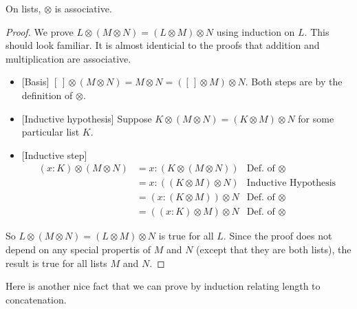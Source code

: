\ipadbreak

\begin{lemma}
On lists, $\otimes$ is associative.

\begin{proof}
We prove $L\otimes(M\otimes N) =
  (L\otimes M)\otimes N$ using induction on $L$. This should look
  familiar. It is almost identicial to the proofs that addition and
  multiplication are associative.

  \begin{itemize}
  \item{}[Basis] $[\,]\otimes(M\otimes N) = M\otimes N = ([\,]\otimes M)\otimes
    N$. Both steps are by the definition of $\otimes$.
  \item{} [Inductive hypothesis] Suppose $K\otimes(M\otimes N) = (K\otimes
    M)\otimes N$ for some particular list $K$.
  \item{} [Inductive step]
    \begin{align*}
      (x:K)\otimes (M\otimes N) &= x:(K\otimes (M\otimes N)) &\mbox{Def. of $\otimes$}\\
      &= x:((K\otimes M)\otimes N) &\mbox{Inductive Hypothesis}\\
      &= (x:(K\otimes M))\otimes N &\mbox{Def. of $\otimes$}\\
      &= ((x:K)\otimes M)\otimes N &\mbox{Def. of $\otimes$}
    \end{align*}
  \end{itemize}
  So $L\otimes(M\otimes N) = (L\otimes M)\otimes N$ is true for all $L$. Since the proof
  does not depend on any special propertis of $M$ and $N$ (except that they are both lists),
  the result is true for all lists $M$ and $N$.
\end{proof}
\end{lemma}

\ipadbreak

Here is another nice fact that we can prove by induction relating
length to concatenation.

